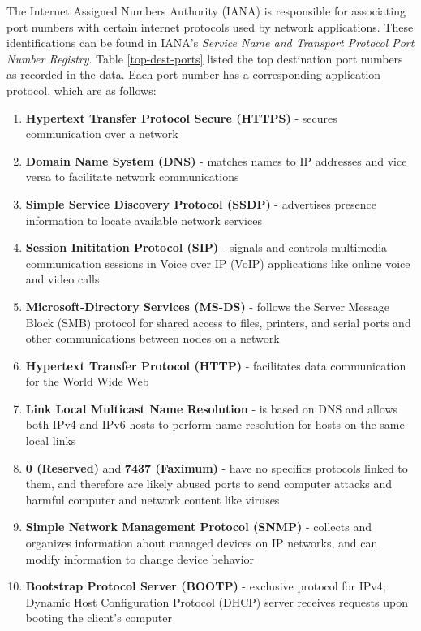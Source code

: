 \documentclass[journal]{IEEE/IEEEtran}
\begin{document}

The Internet Assigned Numbers Authority (IANA) is responsible for associating port numbers with certain internet protocols used by network applications. These identifications can be found in IANA's \textit{Service Name and Transport Protocol Port Number Registry}. Table \ref{top-dest-ports} listed the top destination port numbers as recorded in the data. Each port number has a corresponding application protocol, which are as follows: 


\begin{enumerate}

\item \textbf{Hypertext Transfer Protocol Secure (HTTPS)} - secures communication over a network

\item \textbf{Domain Name System (DNS)} - matches names to IP addresses and vice versa to facilitate network communications

\item \textbf{Simple Service Discovery Protocol (SSDP)} - advertises presence information to locate available network services

\item \textbf{Session Inititation Protocol (SIP)} - signals and controls multimedia communication sessions in Voice over IP (VoIP) applications like online voice and video calls

\item \textbf{Microsoft-Directory Services (MS-DS)} - follows the Server Message Block (SMB) protocol for shared access to files, printers, and serial ports and other communications between nodes on a network

\item \textbf{Hypertext Transfer Protocol (HTTP)} - facilitates data communication for the World Wide Web

\item \textbf{Link Local Multicast Name Resolution} - is based on DNS and allows both IPv4 and IPv6 hosts to perform name resolution for hosts on the same local links

\item \textbf{0 (Reserved)} and \textbf{7437 (Faximum)} - have no specifics protocols linked to them, and therefore are likely abused ports to send computer attacks and harmful computer and network content like viruses

\item \textbf{Simple Network Management Protocol (SNMP)} - collects and organizes information about managed devices on IP networks, and can modify information to change device behavior

\item \textbf{Bootstrap Protocol Server (BOOTP)} - exclusive protocol for IPv4; Dynamic Host Configuration Protocol (DHCP) server receives requests upon booting the client's computer

\end{enumerate}
\end{document}
